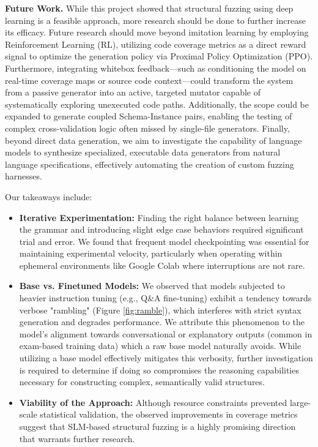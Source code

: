 \documentclass[11pt]{article}
\begin{document}
\textbf{Future Work.} While this project showed that structural fuzzing using deep learning is a feasible approach, more research should be done to further increase its efficacy. Future research should move beyond imitation learning by employing Reinforcement Learning (RL), utilizing code coverage metrics as a direct reward signal to optimize the generation policy via Proximal Policy Optimization (PPO). Furthermore, integrating whitebox feedback—such as conditioning the model on real-time coverage maps or source code context—could transform the system from a passive generator into an active, targeted mutator capable of systematically exploring unexecuted code paths. Additionally, the scope could be expanded to generate coupled Schema-Instance pairs, enabling the testing of complex cross-validation logic often missed by single-file generators. Finally, beyond direct data generation, we aim to investigate the capability of language models to synthesize specialized, executable data generators from natural language specifications, effectively automating the creation of custom fuzzing harnesses.

Our takeaways include:
\begin{itemize}
    \item \textbf{Iterative Experimentation:} Finding the right balance between learning the grammar and introducing slight edge case behaviors required significant trial and error. We found that frequent model checkpointing was essential for maintaining experimental velocity, particularly when operating within ephemeral environments like Google Colab where interruptions are not rare.
    \item \textbf{Base vs. Finetuned Models:} We observed that models subjected to heavier instruction tuning (e.g., Q\&A fine-tuning) exhibit a tendency towards verbose "rambling" (Figure \ref{fig:ramble}), which interferes with strict syntax generation and degrades performance. We attribute this phenomenon to the model's alignment towards conversational or explanatory outputs (common in exam-based training data) which a raw base model naturally avoids. While utilizing a base model effectively mitigates this verbosity, further investigation is required to determine if doing so compromises the reasoning capabilities necessary for constructing complex, semantically valid structures.
    \item \textbf{Viability of the Approach:} Although resource constraints prevented large-scale statistical validation, the observed improvements in coverage metrics suggest that SLM-based structural fuzzing is a highly promising direction that warrants further research.
\end{itemize}
\end{document}
